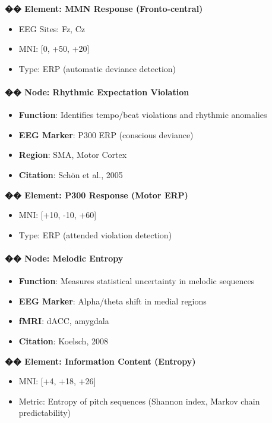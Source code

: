 \textbf{�� Element: MMN Response (Fronto-central)}

\begin{itemize}
    \item EEG Sites: Fz, Cz
    \item MNI: [0, +50, +20]
    \item Type: ERP (automatic deviance detection)
\end{itemize}

\paragraph{�� Node: Rhythmic Expectation Violation}

\begin{itemize}
    \item \textbf{Function}: Identifies tempo/beat violations and rhythmic anomalies
    \item \textbf{EEG Marker}: P300 ERP (conscious deviance)
    \item \textbf{Region}: SMA, Motor Cortex
    \item \textbf{Citation}: Schön et al., 2005
\end{itemize}

\textbf{�� Element: P300 Response (Motor ERP)}

\begin{itemize}
    \item MNI: [+10, -10, +60]
    \item Type: ERP (attended violation detection)
\end{itemize}

\paragraph{�� Node: Melodic Entropy}

\begin{itemize}
    \item \textbf{Function}: Measures statistical uncertainty in melodic sequences
    \item \textbf{EEG Marker}: Alpha/theta shift in medial regions
    \item \textbf{fMRI}: dACC, amygdala
    \item \textbf{Citation}: Koelsch, 2008
\end{itemize}

\textbf{�� Element: Information Content (Entropy)}

\begin{itemize}
    \item MNI: [+4, +18, +26]
    \item Metric: Entropy of pitch sequences (Shannon index, Markov chain predictability)
\end{itemize}


